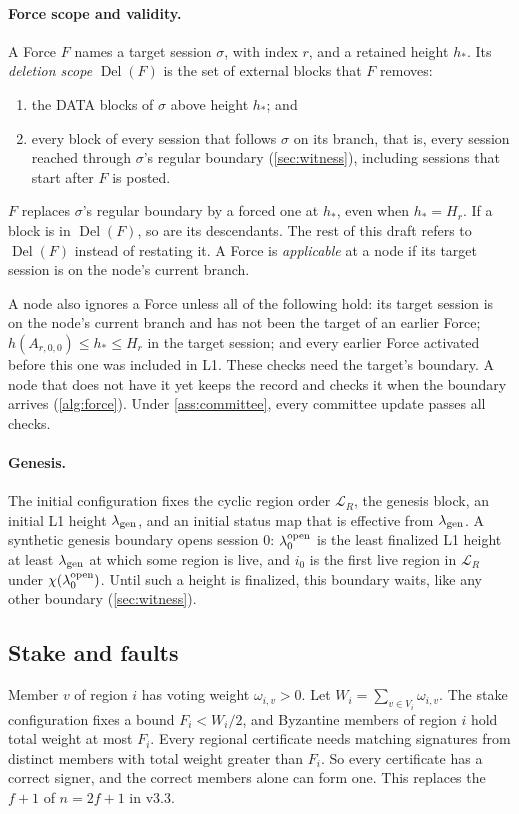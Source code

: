\documentclass[11pt,a4paper]{article}
\newif\ifrevmarks
\newcommand{\Rv}[1]{\ifrevmarks\leavevmode{\color{rvBlue}#1}\else#1\fi}
\newcommand{\Cid}[1]{\ifrevmarks\textsuperscript{\hyperlink{chg:#1}{\color{rvBlue}\sffamily\scriptsize#1}}\fi}
\newcommand{\Del}{\operatorname{Del}}
\begin{document}
\paragraph{\Rv{Force scope and validity.}}
\Rv{A Force $F$ names a target session $\sigma$, with index $r$,
and a retained height $h_*$. Its \emph{deletion scope} $\Del(F)$ is the
set of external blocks that $F$ removes:}
\begin{enumerate}[label=(\roman*)]
\item \Rv{the DATA blocks of $\sigma$ above height $h_*$; and}
\item \Rv{every block of every session that follows $\sigma$ on its
branch, that is, every session reached through $\sigma$'s regular
boundary (\cref{sec:witness}), including sessions that start after $F$
is posted.}
\end{enumerate}
\Rv{$F$ replaces $\sigma$'s regular boundary by a forced one at $h_*$,
even when $h_*=H_r$. If a block is in $\Del(F)$, so are its descendants.
The rest of this draft refers to $\Del(F)$ instead of restating it.
\Cid{B4}A Force is \emph{applicable} at a node if its target session is
on the node's current branch.}

\Rv{A node also ignores a Force unless all of the following
hold: its target session is on the node's current branch and has not
been the target of an earlier Force; $h(A_{r,0,0})\le h_*\le H_r$ in the
target session; and every earlier Force activated before this one was
included in L1. These checks need the target's boundary. A node that
does not have it yet keeps the record and checks it when the boundary
arrives (\cref{alg:force}). Under \cref{ass:committee}, every committee
update passes all checks.}

\paragraph{\Rv{Genesis.}}
\Rv{The initial configuration fixes the cyclic region order
$\mathcal L_R$, the genesis block, an initial L1 height
$\lambda_{\rm gen}$, and an initial status map that is effective from
$\lambda_{\rm gen}$. A synthetic genesis boundary opens session $0$:
$\lambda^{\rm open}_0$ is the least finalized L1 height at least
$\lambda_{\rm gen}$ at which some region is live, and $i_0$ is the first
live region in $\mathcal L_R$ under $\chi(\lambda^{\rm open}_0)$. Until
such a height is finalized, this boundary waits, like any other
boundary (\cref{sec:witness}).}

\subsection{Stake and faults}
\label{sec:stake}
Member $v$ of region $i$ has voting weight $\omega_{i,v}>0$. Let
$W_i=\sum_{v\in V_i}\omega_{i,v}$. \Rv{The stake configuration
fixes a bound $F_i<W_i/2$, and} Byzantine members of region $i$ hold
total weight at most $F_i$. Every regional certificate needs
matching signatures from distinct members with total weight greater than
$F_i$. So every certificate has a correct signer, and the correct members
alone can form one. This replaces the $f+1$ of $n=2f+1$ in v3.3.
\end{document}
